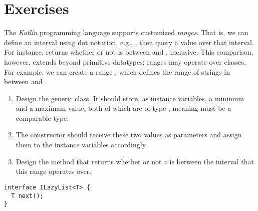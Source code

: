 \section{Exercises}


The \emph{Kotlin} programming language supports customized \emph{ranges}. That is, we can define an interval using dot notation, e.g., , then query a value over that interval. For instance,  returns whether or not  is between  and , inclusive. This comparison, however, extends beyond primitive datatypes; ranges may operate over classes. For example, we can create a range , which defines the range of strings in between  and .

\begin{enumerate}[label=(\alph*)]
    \item Design the generic  class. It should store, as instance variables, a minimum and a maximum value, both of which are of type , meaning  must be a comparable type.
    \item The  constructor should receive these two values as parameters and assign them to the instance variables accordingly. 
    \item Design the  method that returns whether or not $v$ is between the interval that this range operates over. 
\end{enumerate}


\begin{lstlisting}[language=MyJava]
interface ILazyList<T> {
  T next();
}
\end{lstlisting}

